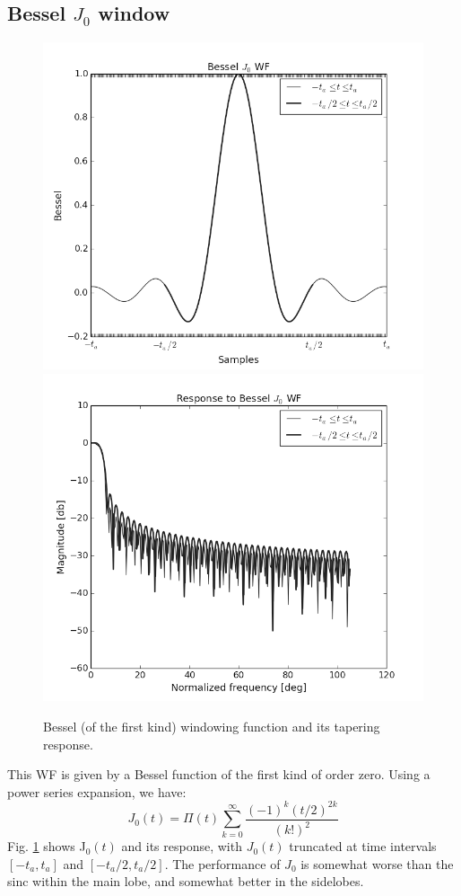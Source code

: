 \documentclass[useAMS,usenatbib]{mn2e}
\begin{document}
\subsection{Bessel $J_0$ window}
\label{Bessel}
\begin{figure}
\includegraphics[width=.5\textwidth]{./Figures/besselgrey.png}%
\includegraphics[width=.5\textwidth]{./Figures/freq_resp_besselgrey.png}
\caption{Bessel (of the first kind) windowing function and its tapering response.}\label{fig:wf:bessel}
\end{figure}


This WF is given by a Bessel function of the first kind of order zero. Using a power series expansion, we have:
\begin{equation}
J_0(t) = \Pi(t) \sum_{k=0}^{\infty}\frac{(-1)^k (t/2)^{2k}}{(k!)^2}
\end{equation}
Fig. \ref{fig:wf:bessel} shows J$_0(t)$ and its response, with $J_0(t)$ truncated at time intervals $[-t_a,t_a]$ and 
$[-t_a/2,t_a/2]$. The performance of $J_0$ is somewhat worse than the sinc within the main lobe, and somewhat better in
the sidelobes.
\end{document}
